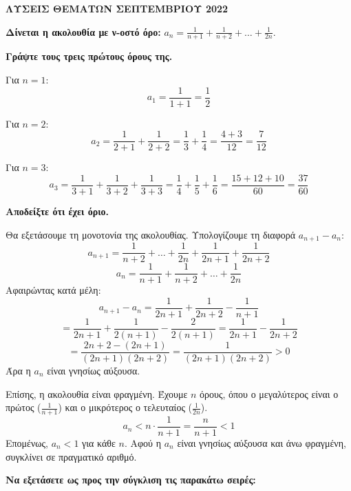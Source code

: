 



\begin{center}
    \textbf{\Large ΛΥΣΕΙΣ ΘΕΜΑΤΩΝ ΣΕΠΤΕΜΒΡΙΟΥ 2022}
\end{center}

\begin{thema}[label=\bf\large{ΘΕΜΑ \textcolor{black}{\arabic*}}]

\item %
\textbf{Δίνεται η ακολουθία με ν-οστό όρο:} $a_n = \frac{1}{n+1} + \frac{1}{n+2} + \dots + \frac{1}{2n}$.

\begin{alist}
    \item \textbf{Γράψτε τους τρεις πρώτους όρους της.}
    
    Για $n=1$:
    \[ a_1 = \frac{1}{1+1} = \frac{1}{2} \]
    
    Για $n=2$:
    \[ a_2 = \frac{1}{2+1} + \frac{1}{2+2} = \frac{1}{3} + \frac{1}{4} = \frac{4+3}{12} = \frac{7}{12} \]
    
    Για $n=3$:
    \[ a_3 = \frac{1}{3+1} + \frac{1}{3+2} + \frac{1}{3+3} = \frac{1}{4} + \frac{1}{5} + \frac{1}{6} = \frac{15+12+10}{60} = \frac{37}{60} \]

    \item \textbf{Αποδείξτε ότι έχει όριο.}
    
    Θα εξετάσουμε τη μονοτονία της ακολουθίας. Υπολογίζουμε τη διαφορά $a_{n+1} - a_n$:
    \[ a_{n+1} = \frac{1}{n+2} + \dots + \frac{1}{2n} + \frac{1}{2n+1} + \frac{1}{2n+2} \]
    \[ a_n = \frac{1}{n+1} + \frac{1}{n+2} + \dots + \frac{1}{2n} \]
    Αφαιρώντας κατά μέλη:
    \[ a_{n+1} - a_n = \frac{1}{2n+1} + \frac{1}{2n+2} - \frac{1}{n+1} \]
    \[ = \frac{1}{2n+1} + \frac{1}{2(n+1)} - \frac{2}{2(n+1)} = \frac{1}{2n+1} - \frac{1}{2n+2} \]
    \[ = \frac{2n+2 - (2n+1)}{(2n+1)(2n+2)} = \frac{1}{(2n+1)(2n+2)} > 0 \]
    Άρα η $a_n$ είναι γνησίως αύξουσα.
    
    Επίσης, η ακολουθία είναι φραγμένη. Έχουμε $n$ όρους, όπου ο μεγαλύτερος είναι ο πρώτος ($\frac{1}{n+1}$) και ο μικρότερος ο τελευταίος ($\frac{1}{2n}$).
    \[ a_n < n \cdot \frac{1}{n+1} = \frac{n}{n+1} < 1 \]
    Επομένως, $a_n < 1$ για κάθε $n$.
    Αφού η $a_n$ είναι γνησίως αύξουσα και άνω φραγμένη, συγκλίνει σε πραγματικό αριθμό.
\end{alist}

\item %
\textbf{Να εξετάσετε ως προς την σύγκλιση τις παρακάτω σειρές:}


\end{thema}
